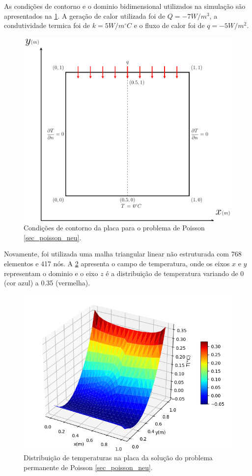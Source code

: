 As condições de contorno e o dominio bidimensional utilizados na simulação são apresentados na \ref{poisson_n_bc}.
A geração de calor utilizada foi de $Q = -7W/m^3$, a condutividade termica foi de $k=5 W/m^{\circ}C$ e o fluxo de calor foi de $q = -5 W/m^2$.
\begin{figure}[H]
    \centering
    \includegraphics[width=.7\linewidth]{figures/poisson_neumann_boundary_conditions.pdf}
    \caption{Condições de contorno da placa para o problema de Poisson \ref{sec_poisson_neu}.}
    \label{poisson_n_bc}
\end{figure}

Novamente, foi utilizada uma malha triangular linear não estruturada com 768 elementos e 417 nós.
A \ref{poisson_n_3d} apresenta o campo de temperatura, onde os eixos $x$ e $y$ representam o dominio e o eixo $z$ é a distribuição de temperatura variando de 0 (cor azul) a 0.35 (vermelha).
\begin{figure}[H]
    \centering
    \includegraphics[width=.7\linewidth]{figures/poisson_neumann_permanent_3d.png}
    \caption{Distribuição de temperaturas na placa da solução do problema permanente de Poisson \ref{sec_poisson_neu}.}
    \label{poisson_n_3d}
\end{figure}


